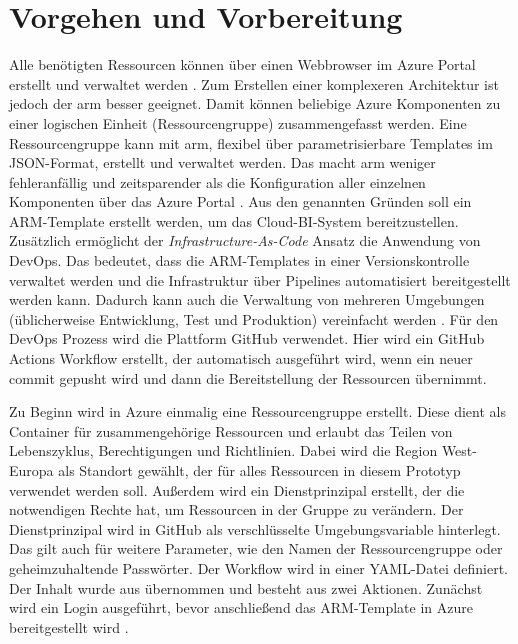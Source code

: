 \section{Vorgehen und Vorbereitung} \label{sec:intro:azDevOps}
Alle benötigten Ressourcen können über einen Webbrowser im Azure Portal erstellt und verwaltet werden \cite{chilberto_building_2020}. Zum Erstellen einer komplexeren Architektur ist jedoch der \ac{arm} besser geeignet. Damit können beliebige Azure Komponenten zu einer logischen Einheit (Ressourcengruppe) zusammengefasst werden. Eine Ressourcengruppe kann mit \ac{arm}, flexibel über parametrisierbare Templates im JSON-Format, erstellt und verwaltet werden. Das macht \ac{arm} weniger fehleranfällig und zeitsparender als die Konfiguration aller einzelnen Komponenten über das Azure Portal \cite{monadjemi_azure-administration_2017}. Aus den genannten Gründen soll ein ARM-Template erstellt werden, um das Cloud-BI-System bereitzustellen. Zusätzlich ermöglicht der \textit{Infrastructure-As-Code} Ansatz die Anwendung von DevOps. Das bedeutet, dass die ARM-Templates in einer Versionskontrolle verwaltet werden und die Infrastruktur über Pipelines automatisiert bereitgestellt werden kann. Dadurch kann auch die Verwaltung von mehreren Umgebungen (üblicherweise Entwicklung, Test und Produktion) vereinfacht werden \cite{riscutia_data_2021}. Für den DevOps Prozess wird die Plattform GitHub verwendet. Hier wird ein GitHub Actions Workflow erstellt, der automatisch ausgeführt wird, wenn ein neuer commit gepusht wird und dann die Bereitstellung der Ressourcen übernimmt. 

Zu Beginn wird in Azure einmalig eine Ressourcengruppe erstellt. Diese dient als Container für zusammengehörige Ressourcen und erlaubt das Teilen von Lebenszyklus, Berechtigungen und Richtlinien. Dabei wird die Region West-Europa als Standort gewählt, der für alles Ressourcen in diesem Prototyp verwendet werden soll. Außerdem wird ein Dienstprinzipal erstellt, der die notwendigen Rechte hat, um Ressourcen in der Gruppe zu verändern. Der Dienstprinzipal wird in GitHub als verschlüsselte Umgebungsvariable hinterlegt. Das gilt auch für weitere Parameter, wie den Namen der Ressourcengruppe oder geheimzuhaltende Passwörter. Der Workflow wird in einer YAML-Datei definiert. Der Inhalt wurde aus  übernommen und besteht aus zwei Aktionen. Zunächst wird ein Login ausgeführt, bevor anschließend das ARM-Template in Azure bereitgestellt wird \cite[vgl.][]{rendon_deploy_2022}.